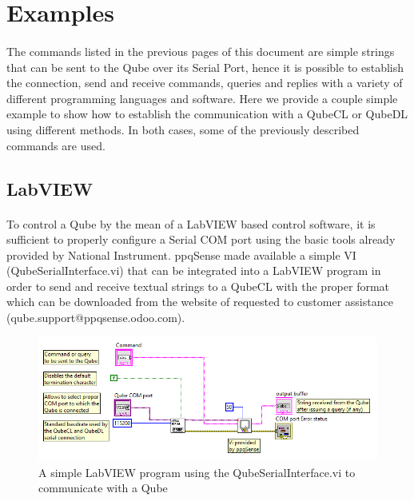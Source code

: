 \section{Examples}
\paragraph{} The commands listed in the previous pages of this document are simple strings that can be sent to the Qube over its Serial Port, hence it is possible to establish the connection, send and receive commands, queries and replies with a variety of different programming languages and software.
\newline
Here we provide a couple simple example to show how to establish the communication with a QubeCL or QubeDL using different methods. In both cases, some of the previously described commands are used.



\subsection{LabVIEW}
\paragraph{} To control a Qube by the mean of a LabVIEW based control software, it is sufficient to properly configure a Serial COM port using the basic tools already provided by National Instrument.
\newline ppqSense made available a simple VI (Qube\textunderscore Serial\textunderscore Interface.vi) that can be integrated into a LabVIEW program in order to send and receive textual strings to a QubeCL with the proper format which can be downloaded from the website of requested to customer assistance (qube.support@ppqsense.odoo.com).

\begin{figure}[h]
    \centering
    \includegraphics[width=15cm]{images/LabVIEW_VI_example.png}
    \caption{A simple LabVIEW program using the Qube\textunderscore Serial\textunderscore Interface.vi to communicate with a Qube}
    \label{LabVIEW_VI_example}
\end{figure}

